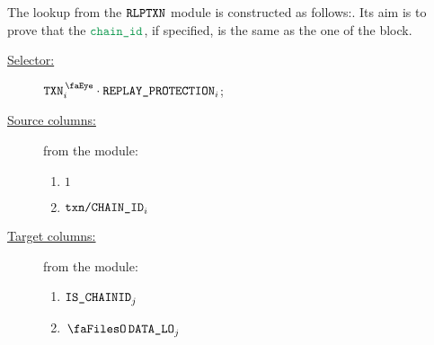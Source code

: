 The lookup from the $\texttt{RLPTXN}$ module is constructed as follows:. Its aim is to prove that the $\locChainId$, if specified, is the same as the one of the block.
\begin{description}
	\item[\underline{Selector:}] $\isTxn _{i} \cdot \rlpTxnCommonColumnReplayProtection _{i}$;
	\item[\underline{Source columns:}] from the \rlpTxnMod{} module:
	\begin{multicols}{2}
	\begin{enumerate}
		\item $1$
		\item $\texttt{txn}\texttt{/}\texttt{{CHAIN\_ID}} _{i}$
	\end{enumerate}
	\end{multicols}
\item[\underline{Target columns:}] from the \btcMod{} module: 
	\begin{multicols}{2}
	\begin{enumerate}
		\item $\texttt{IS\_CHAINID}   _{j}$
		\item $\blockDataLo _{j}$
	\end{enumerate} 
	\end{multicols}
\end{description}
